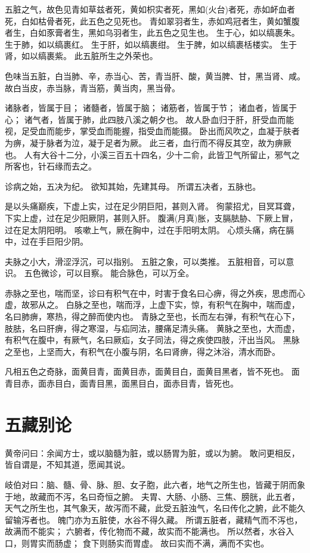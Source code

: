\documentclass{article}%
\begin{document}
五脏之气，故色见青如草兹者死，黄如枳实者死，黑如(火台)者死，赤如衃血者死，白如枯骨者死，此五色之见死也。
青如翠羽者生，赤如鸡冠者生，黄如蟹腹者生，白如豕膏者生，黑如乌羽者生，此五色之见生也。
生于心，如以缟裹朱。
生于肺，如以缟裹红。
生于肝，如以缟裹绀。
生于脾，如以缟裹栝楼实。
生于肾，如以缟裹紫。
此五脏所生之外荣也。

色味当五脏，白当肺、辛，赤当心、苦，青当肝、酸，黄当脾、甘，黑当肾、咸。
故白当皮，赤当脉，青当筋，黄当肉，黑当骨。

诸脉者，皆属于目；
诸髓者，皆属于脑；
诸筋者，皆属于节；
诸血者，皆属于心；
诸气者，皆属于肺，此四肢八溪之朝夕也。
故人卧血归于肝，肝受血而能视，足受血而能步，掌受血而能握，指受血而能摄。
卧出而风吹之，血凝于肤者为痹，凝于脉者为泣，凝于足者为厥。
此三者，血行而不得反其空，故为痹厥也。
人有大谷十二分，小溪三百五十四名，少十二俞，此皆卫气所留止，邪气之所客也，针石缘而去之。

诊病之始，五决为纪。
欲知其始，先建其母。
所谓五决者，五脉也。

是以头痛巅疾，下虚上实，过在足少阴巨阳，甚则入肾。
徇蒙招尤，目冥耳聋，下实上虚，过在足少阳厥阴，甚则入肝。
腹满(月真)胀，支膈胠胁、下厥上冒，过在足太阴阳明。
咳嗽上气，厥在胸中，过在手阳明太阴。
心烦头痛，病在膈中，过在手巨阳少阴。

夫脉之小大，滑涩浮沉，可以指别。
五脏之象，可以类推。
五脏相音，可以意识。
五色微诊，可以目察。
能合脉色，可以万全。

赤脉之至也，喘而坚，诊曰有积气在中，时害于食名曰心痹，得之外疾，思虑而心虚，故邪从之。
白脉之至也，喘而浮，上虚下实，惊，有积气在胸中，喘而虚，名曰肺痹，寒热，得之醉而使内也。
青脉之至也，长而左右弹，有积气在心下，肢胠，名曰肝痹，得之寒湿，与疝同法，腰痛足清头痛。
黄脉之至也，大而虚，有积气在腹中，有厥气，名曰厥疝，女子同法，得之疾使四肢，汗出当风。
黑脉之至也，上坚而大，有积气在小腹与阴，名曰肾痹，得之沐浴，清水而卧。

凡相五色之奇脉，面黄目青，面黄目赤，面黄目白，面黄目黑者，皆不死也。
面青目赤，面赤目白，面青目黑，面黑目白，面赤目青，皆死也。


\section{五藏别论}
黄帝问曰：余闻方士，或以脑髓为脏，或以肠胃为脏，或以为腑。
敢问更相反，皆自谓是，不知其道，愿闻其说。

岐伯对曰：脑、髓、骨、脉、胆、女子胞，此六者，地气之所生也，皆藏于阴而象于地，故藏而不泻，名曰奇恒之腑。
夫胃、大肠、小肠、三焦、膀胱，此五者，天气之所生也，其气象天，故泻而不藏，此受五脏浊气，名曰传化之腑，此不能久留输泻者也。
魄门亦为五脏使，水谷不得久藏。
所谓五脏者，藏精气而不泻也，故满而不能实；
六腑者，传化物而不藏，故实而不能满也。
所以然者，水谷入口，则胃实而肠虚；
食下则肠实而胃虚。
故曰实而不满，满而不实也。
\end{document}
